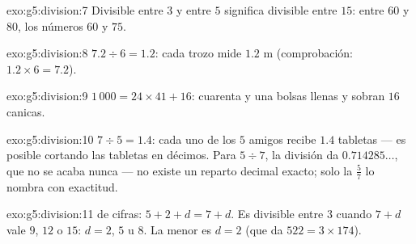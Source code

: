\begin{solution}{exo:g5:division:7}
Divisible entre $3$ y entre $5$ significa divisible entre $15$: entre $60$ y
$80$, los números $60$ y $75$.
\end{solution}

\begin{solution}{exo:g5:division:8}
$7.2 \div 6 = 1.2$: cada trozo mide $1.2$ m (comprobación:
$1.2 \times 6 = 7.2$).
\end{solution}

\begin{solution}{exo:g5:division:9}
$1\,000 = 24 \times 41 + 16$: cuarenta y una bolsas llenas y sobran $16$
canicas.
\end{solution}

\begin{solution}{exo:g5:division:10}
$7 \div 5 = 1.4$: cada uno de los $5$ amigos recibe $1.4$ tabletas ---
es posible cortando las tabletas en décimos. Para $5 \div 7$, la división
da $0.714285\dots$, que no se acaba nunca --- no existe un reparto decimal
exacto; solo la  $\frac57$ lo nombra con exactitud.
\end{solution}

\begin{solution}{exo:g5:division:11}
 de cifras: $5 + 2 + d = 7 + d$. Es divisible entre $3$ cuando $7 + d$ vale
$9$, $12$ o $15$: $d = 2$, $5$ u $8$. La menor es $d = 2$
(que da $522 = 3 \times 174$).
\end{solution}
